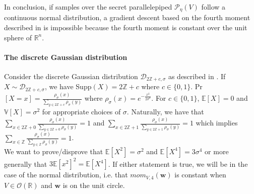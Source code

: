 \documentclass[12 pt]{article}        	%
\newcommand{\PP}[2][]{\mathcal{P}_{#1}(\mat{#2})}
\newcommand{\mat}[1]{\mathit{#1}}
\renewcommand{\vec}[1]{\mathbf{#1}}
\newcommand{\bb}[1]{\mathbb{#1}}
\begin{document}
In conclusion, if samples over the secret parallelepiped $\PP[\eta]{V}$ follow a continuous normal distribution, a gradient descent based on the fourth moment described in \cite{NR09}
is impossible because the fourth moment is constant over the unit sphere of $\bb{R}^n$.
\paragraph{The discrete Gaussian distribution}
Consider the discrete Gaussian distribution $\mathcal{D}_{2 \bb{Z} + c, \sigma}$ as described in \cite{HawkSpec24}.
If $X \sim \mathcal{D}_{2 \bb{Z} + c, \sigma}$, we have Supp$(X) = 2 \bb{Z} + c$ where $c \in \{0, 1\}$. Pr$[X = x] = \frac{\rho_{\sigma}(x)}{\sum_{y \in 2 \bb{Z} + c} \rho_{\sigma}(y)}$
where $\rho_{\sigma}(x) = e^{-\frac{x^2}{2 \sigma^2}}$. For $c \in \{0, 1 \}$, $\bb{E}[X] = 0$ and $\bb{V}[X] = \sigma^2$ for appropriate choices of $\sigma$.
Naturally, we have that $\sum_{x \in 2\bb{Z}+0}\frac{\rho_{\sigma}(x)}{\sum_{y \in 2 \bb{Z} + 0} \rho_{\sigma}(y)} = 1$
and $\sum_{x \in 2\bb{Z}+1}\frac{\rho_{\sigma}(x)}{\sum_{y \in 2 \bb{Z} + 1} \rho_{\sigma}(y)} = 1$
which implies $\sum_{x \in \bb{Z}}\frac{\rho_{\sigma}(x)}{\sum_{y \in \bb{Z}} \rho_{\sigma}(y)} = 1$. \\

We want to prove/disprove that $\bb{E}[X^2] = \sigma^2$ and $\bb{E}[X^4] = 3 \sigma ^4$ or more generally that $3 \bb{E}[x^2]^2 = \bb{E}[X^4]$. 
If either statement is true, we will be in the case of the normal distribution, i.e. 
that $mom_{\mat{V}, 4}(\vec{w})$ is constant when $\mat{V} \in \mathcal{O}(\bb{R})$ and $\vec{w}$ is on the unit circle.
\end{document}
